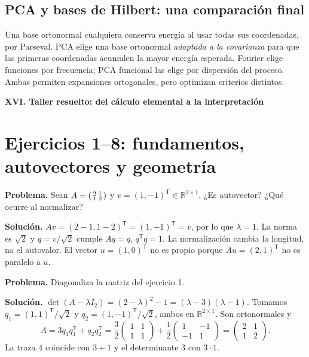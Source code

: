 \documentclass[11pt,a4paper]{article}
\newcommand{\R}{\mathbb R}
\newcommand{\T}{^{\mathsf T}}
\theoremstyle{definition}
\newcommand{\parte}[1]{\par\bigskip\Needspace{8\baselineskip}\begin{center}{\Large\bfseries\color{azul}#1}\end{center}}
\begin{document}
\subsection{PCA y bases de Hilbert: una comparación final}
Una base ortonormal cualquiera conserva energía al usar todas sus coordenadas, por Parseval. PCA elige una base ortonormal \emph{adaptada a la covarianza} para que las primeras coordenadas acumulen la mayor energía esperada. Fourier elige funciones por frecuencia; PCA funcional las elige por dispersión del proceso. Ambas permiten expansiones ortogonales, pero optimizan criterios distintos.

\parte{XVI. Taller resuelto: del cálculo elemental a la interpretación}
\section{Ejercicios 1--8: fundamentos, autovectores y geometría}
\begin{ejemplo}
\textbf{Problema.} Sean $A=\begin{psmallmatrix}2&1\\1&2\end{psmallmatrix}$ y $v=(1,-1)\T\in\R^{2\times1}$. ¿Es autovector? ¿Qué ocurre al normalizar?

\textbf{Solución.} $Av=(2-1,1-2)\T=(1,-1)\T=v$, por lo que $\lambda=1$. La norma es $\sqrt2$ y $q=v/\sqrt2$ cumple $Aq=q$, $q\T q=1$. La normalización cambia la longitud, no el autovalor. El vector $u=(1,0)\T$ no es propio porque $Au=(2,1)\T$ no es paralelo a $u$.
\end{ejemplo}
\begin{ejemplo}
\textbf{Problema.} Diagonaliza la matriz del ejercicio 1.

\textbf{Solución.} $\det(A-\lambda I_2)=(2-\lambda)^2-1=(\lambda-3)(\lambda-1)$. Tomamos $q_1=(1,1)\T/\sqrt2$ y $q_2=(1,-1)\T/\sqrt2$, ambos en $\R^{2\times1}$. Son ortonormales y
\[
A=3q_1q_1\T+q_2q_2\T
=\frac32\begin{pmatrix}1&1\\1&1\end{pmatrix}+\frac12\begin{pmatrix}1&-1\\-1&1\end{pmatrix}
=\begin{pmatrix}2&1\\1&2\end{pmatrix}.
\]
La traza $4$ coincide con $3+1$ y el determinante $3$ con $3\cdot1$.
\end{ejemplo}
\end{document}
